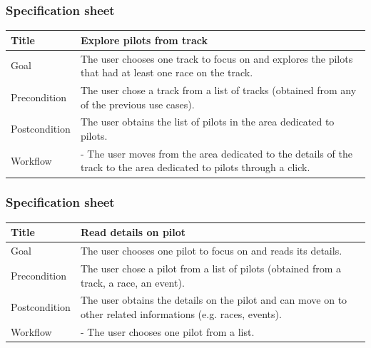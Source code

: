 \documentclass{beamer}
\begin{document}
\begin{frame}
    \frametitle{Specification sheet}
    \begin{table}
        \tiny
        \begin{tabular}{|p{2cm}|p{6cm}|}
        \hline
        Title & \textbf{Explore pilots from track} \\
        \hline
        Goal & The user chooses one track to focus on and explores the pilots that had at least one race on the track. \\
        \hline
        Precondition & The user chose a track from a list of tracks (obtained from any of the previous use cases).\\
        \hline
        Postcondition & The user obtains the list of pilots in the area dedicated to pilots. \\
        \hline
        Workflow &
        - The user moves from the area dedicated to the details of the track to the
        area dedicated to pilots through a click. \\
        \hline
        \end{tabular}
\end{table}
\end{frame}

\begin{frame}
    \frametitle{Specification sheet}
    \begin{table}
        \tiny
        \begin{tabular}{|p{2cm}|p{6cm}|}
        \hline
        Title & \textbf{Read details on pilot} \\
        \hline
        Goal & The user chooses one pilot to focus on and reads its details. \\
        \hline
        Precondition & The user chose a pilot from a list of pilots (obtained from a track, a race, an event).\\
        \hline
        Postcondition & The user obtains the details on the pilot and can move on to other related informations (e.g. races, events). \\
        \hline
        Workflow &
        - The user chooses one pilot from a list. \\
        \hline
        \end{tabular}
\end{table}
\end{frame}
\end{document}
